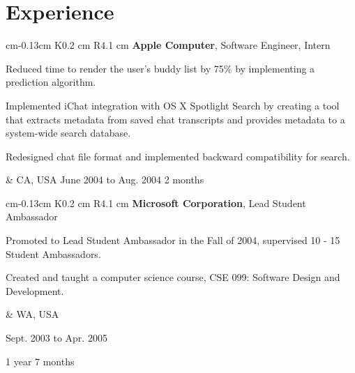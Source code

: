 \section{Experience}
\begin{tabularx}{
     cm-0.13cm
}{
    K{0.2 cm}
    R{4.1 cm}
}
    \textbf{Apple Computer}, Software Engineer, Intern
    \vspace{0.10 cm}
    \begin{highlights}
        \item Reduced time to render the user's buddy list by 75\% by implementing a prediction algorithm.
        \item Implemented iChat integration with OS X Spotlight Search by creating a tool that extracts metadata from saved chat transcripts and provides metadata to a system-wide search database.
        \item Redesigned chat file format and implemented backward compatibility for search.
    \end{highlights}
    &
    CA, USA
    June 2004 to Aug. 2004
    2 months
\end{tabularx}

\vspace{0.2 cm}
\begin{tabularx}{
     cm-0.13cm
}{
    K{0.2 cm}
    R{4.1 cm}
}
    \textbf{Microsoft Corporation}, Lead Student Ambassador

    \vspace{0.10 cm}

    \begin{highlights}
        \item Promoted to Lead Student Ambassador in the Fall of 2004, supervised 10 - 15 Student Ambassadors.
        \item Created and taught a computer science course, CSE 099: Software Design and Development.
    \end{highlights}
    &
    WA, USA

    Sept. 2003 to Apr. 2005

    1 year 7 months
\end{tabularx}

